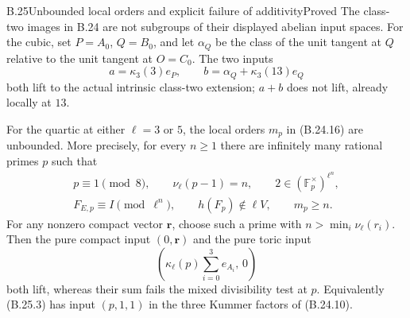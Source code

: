 \begin{statement}{B.25}{Unbounded local orders and explicit failure of additivity}{Proved}
The class-two images in B.24 are not subgroups of their
displayed abelian input spaces.
For the cubic, set $P=A_0$, $Q=B_0$, and let $\alpha_Q$
be the class of the unit tangent at $Q$ relative to the
unit tangent at $O=C_0$. The two inputs
\[
 a=\kappa_3(3)e_P,\qquad
 b=\alpha_Q+\kappa_3(13)e_Q
                                                               \tag{B.25.1}
\]
both lift to the actual intrinsic class-two extension;
$a+b$ does not lift, already locally at $13$.

For the quartic at either $\ell=3$ or $5$, the local
orders $m_p$ in (B.24.16) are unbounded.
More precisely, for every $n\geq1$ there are infinitely
many rational primes $p$ such that
\[
 \begin{gathered}
 p\equiv1\pmod8,\qquad \nu_\ell(p-1)=n,\qquad
 2\in(\mathbb F_p^\times)^{\ell^n},\\
 F_{E,p}\equiv I\pmod{\ell^n},\qquad
 h(F_p)\notin\ell V,\qquad m_p\geq n .
 \end{gathered}                                                 \tag{B.25.2}
\]
For any nonzero compact vector $\mathbf r$, choose such a
prime with $n>\min_i\nu_\ell(r_i)$.
Then the pure compact input $(0,\mathbf r)$ and the
pure toric input
\[
 \left(\kappa_\ell(p)\sum_{i=0}^3e_{A_i},\,0\right)
                                                               \tag{B.25.3}
\]
both lift, whereas their sum fails the mixed divisibility
test at $p$. Equivalently (B.25.3) has input
$(p,1,1)$ in the three Kummer factors of (B.24.10).
\end{statement}
